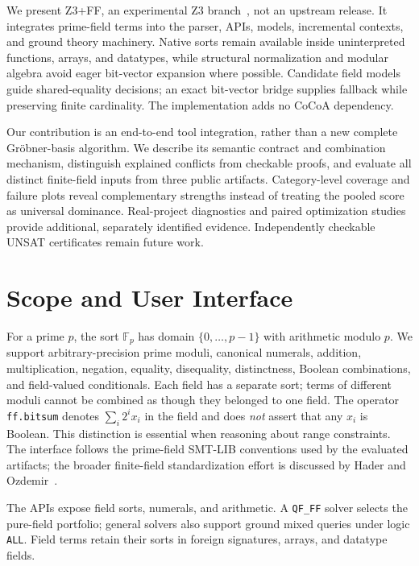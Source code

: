\documentclass[runningheads]{llncs}
\newcommand{\FF}{\mathbb{F}}
\newcommand{\tool}{Z3+FF}
\newcommand{\qfff}{\texttt{QF\_FF}}
\newcommand{\flag}[1]{\texttt{#1}}
\begin{document}
We present \tool{}, an experimental Z3 branch~\cite{z3}, not an upstream
release. It integrates prime-field terms into the parser, APIs, models,
incremental contexts, and ground theory machinery. Native sorts remain available
inside uninterpreted functions, arrays, and datatypes, while structural
normalization and modular algebra avoid eager bit-vector expansion where
possible. Candidate field models guide shared-equality decisions; an exact
bit-vector bridge supplies fallback while preserving finite cardinality.
The implementation adds no CoCoA dependency.

Our contribution is an end-to-end tool integration, rather than a new complete
Gr\"obner-basis algorithm. We describe its semantic contract and combination
mechanism, distinguish explained conflicts from checkable proofs, and evaluate
all distinct finite-field inputs from three public artifacts. Category-level
coverage and failure plots reveal complementary strengths instead of treating
the pooled score as universal dominance. Real-project diagnostics and paired
optimization studies provide additional, separately identified evidence.
Independently checkable UNSAT certificates remain future work.

\section{Scope and User Interface}
\label{sec:scope}

For a prime $p$, the sort $\FF_p$ has domain $\{0,\ldots,p-1\}$ with arithmetic
modulo $p$. We support arbitrary-precision prime moduli, canonical numerals,
addition, multiplication, negation, equality, disequality, distinctness, Boolean
combinations, and field-valued conditionals. Each field has a separate sort;
terms of different moduli cannot be combined as though they belonged to one
field. The operator \flag{ff.bitsum} denotes $\sum_i 2^i x_i$ in the field and
does \emph{not} assert that any $x_i$ is Boolean. This distinction is essential
when reasoning about range constraints. The interface follows the prime-field
SMT-LIB conventions used by the evaluated artifacts; the broader finite-field
standardization effort is discussed by Hader and Ozdemir~\cite{ffa}.

The APIs expose field sorts, numerals, and arithmetic. A \qfff{} solver
selects the pure-field portfolio; general solvers also
support ground mixed queries under logic \flag{ALL}. Field terms retain their
sorts in foreign signatures, arrays, and datatype fields.
\end{document}
